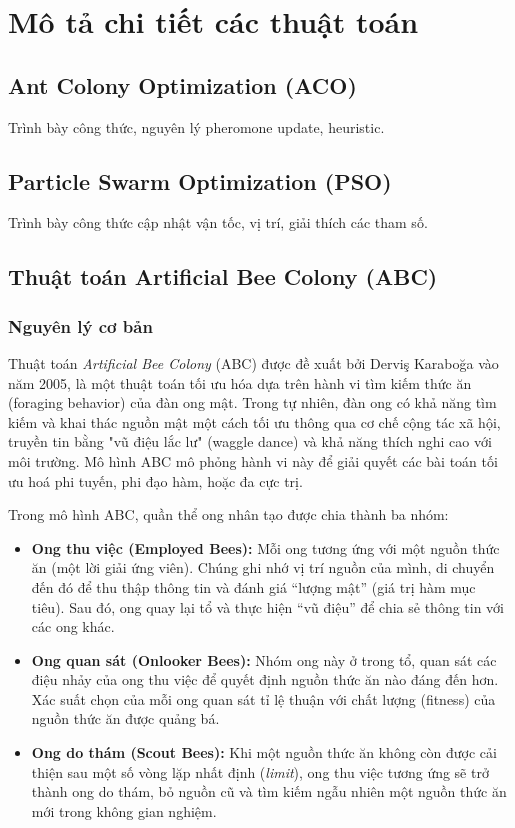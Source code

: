 \documentclass[a4paper]{report}
\begin{document}
\chapter{Mô tả chi tiết các thuật toán}
\section{Ant Colony Optimization (ACO)}
Trình bày công thức, nguyên lý pheromone update, heuristic.


\section{Particle Swarm Optimization (PSO)}
Trình bày công thức cập nhật vận tốc, vị trí, giải thích các tham số.

\section{Thuật toán Artificial Bee Colony (ABC)}

\subsection{Nguyên lý cơ bản}
Thuật toán \textit{Artificial Bee Colony} (ABC) được đề xuất bởi Derviş Karaboğa vào năm 2005, là một thuật toán tối ưu hóa dựa trên hành vi tìm kiếm thức ăn (foraging behavior) của đàn ong mật. Trong tự nhiên, đàn ong có khả năng tìm kiếm và khai thác nguồn mật một cách tối ưu thông qua cơ chế cộng tác xã hội, truyền tin bằng "vũ điệu lắc lư" (waggle dance) và khả năng thích nghi cao với môi trường. Mô hình ABC mô phỏng hành vi này để giải quyết các bài toán tối ưu hoá phi tuyến, phi đạo hàm, hoặc đa cực trị.

Trong mô hình ABC, quần thể ong nhân tạo được chia thành ba nhóm:
\begin{itemize}
    \item \textbf{Ong thu việc (Employed Bees):} Mỗi ong tương ứng với một nguồn thức ăn (một lời giải ứng viên). Chúng ghi nhớ vị trí nguồn của mình, di chuyển đến đó để thu thập thông tin và đánh giá “lượng mật” (giá trị hàm mục tiêu). Sau đó, ong quay lại tổ và thực hiện “vũ điệu” để chia sẻ thông tin với các ong khác.
    \item \textbf{Ong quan sát (Onlooker Bees):} Nhóm ong này ở trong tổ, quan sát các điệu nhảy của ong thu việc để quyết định nguồn thức ăn nào đáng đến hơn. Xác suất chọn của mỗi ong quan sát tỉ lệ thuận với chất lượng (fitness) của nguồn thức ăn được quảng bá.
    \item \textbf{Ong do thám (Scout Bees):} Khi một nguồn thức ăn không còn được cải thiện sau một số vòng lặp nhất định (\textit{limit}), ong thu việc tương ứng sẽ trở thành ong do thám, bỏ nguồn cũ và tìm kiếm ngẫu nhiên một nguồn thức ăn mới trong không gian nghiệm.
\end{itemize}
\end{document}
